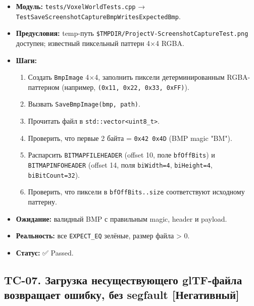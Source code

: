 \begin{itemize}
\tightlist
\item
  \textbf{Модуль:} \texttt{tests/VoxelWorldTests.cpp} → \texttt{TestSaveScreenshotCaptureBmpWritesExpectedBmp}.
\item
  \textbf{Предусловия:} temp-путь \texttt{\$TMPDIR/ProjectV-ScreenshotCaptureTest.png} доступен; известный пиксельный паттерн 4×4 RGBA.
\item
  \textbf{Шаги:}

  \begin{enumerate}
  \def\labelenumi{\arabic{enumi}.}
  \tightlist
  \item
    Создать \texttt{BmpImage} 4×4, заполнить пиксели детерминированным RGBA-паттерном (например, \texttt{(0x11,\ 0x22,\ 0x33,\ 0xFF)}).
  \item
    Вызвать \texttt{SaveBmpImage(bmp,\ path)}.
  \item
    Прочитать файл в \texttt{std::vector\textless{}uint8\_t\textgreater{}}.
  \item
    Проверить, что первые 2 байта = \texttt{0x42\ 0x4D} (BMP magic "BM").
  \item
    Распарсить \texttt{BITMAPFILEHEADER} (offset 10, поле \texttt{bfOffBits}) и \texttt{BITMAPINFOHEADER} (offset 14, поля \texttt{biWidth=4}, \texttt{biHeight=4}, \texttt{biBitCount=32}).
  \item
    Проверить, что пиксели в \texttt{bfOffBits..size} соответствуют исходному паттерну.
  \end{enumerate}
\item
  \textbf{Ожидание:} валидный BMP с правильным magic, header и payload.
\item
  \textbf{Реальность:} все \texttt{EXPECT\_EQ} зелёные, размер файла \textgreater{} 0.
\item
  \textbf{Статус:} ✅ Passed.
\end{itemize}

\subsection{TC-07. Загрузка несуществующего glTF-файла возвращает ошибку, без segfault {[}Негативный{]}}\label{KT-2.2_Test_Report-tc-07-ux437ux430ux433ux440ux443ux437ux43aux430-ux43dux435ux441ux443ux449ux435ux441ux442ux432ux443ux44eux449ux435ux433ux43e-gltf-ux444ux430ux439ux43bux430-ux432ux43eux437ux432ux440ux430ux449ux430ux435ux442-ux43eux448ux438ux431ux43aux443-ux431ux435ux437-segfault-ux43dux435ux433ux430ux442ux438ux432ux43dux44bux439}

